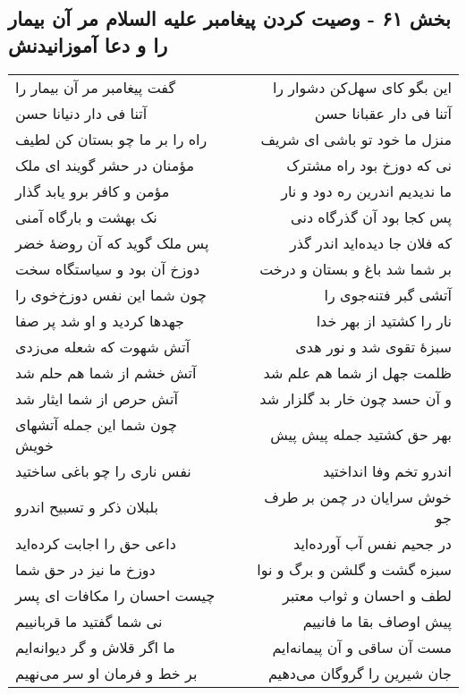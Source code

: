 \begin{center}
\section*{بخش ۶۱ - وصیت کردن پیغامبر علیه السلام مر آن بیمار را و دعا آموزانیدنش}
\label{sec:sh061}
\begin{longtable}{l p{0.5cm} r}
گفت پیغامبر مر آن بیمار را
&&
این بگو کای سهل‌کن دشوار را
\\
آتنا فی دار دنیانا حسن
&&
آتنا فی دار عقبانا حسن
\\
راه را بر ما چو بستان کن لطیف
&&
منزل ما خود تو باشی ای شریف
\\
مؤمنان در حشر گویند ای ملک
&&
نی که دوزخ بود راه مشترک
\\
مؤمن و کافر برو یابد گذار
&&
ما ندیدیم اندرین ره دود و نار
\\
نک بهشت و بارگاه آمنی
&&
پس کجا بود آن گذرگاه دنی
\\
پس ملک گوید که آن روضهٔ خضر
&&
که فلان جا دیده‌اید اندر گذر
\\
دوزخ آن بود و سیاستگاه سخت
&&
بر شما شد باغ و بستان و درخت
\\
چون شما این نفس دوزخ‌خوی را
&&
آتشی گبر فتنه‌جوی را
\\
جهدها کردید و او شد پر صفا
&&
نار را کشتید از بهر خدا
\\
آتش شهوت که شعله می‌زدی
&&
سبزهٔ تقوی شد و نور هدی
\\
آتش خشم از شما هم حلم شد
&&
ظلمت جهل از شما هم علم شد
\\
آتش حرص از شما ایثار شد
&&
و آن حسد چون خار بد گلزار شد
\\
چون شما این جمله آتشهای خویش
&&
بهر حق کشتید جمله پیش پیش
\\
نفس ناری را چو باغی ساختید
&&
اندرو تخم وفا انداختید
\\
بلبلان ذکر و تسبیح اندرو
&&
خوش سرایان در چمن بر طرف جو
\\
داعی حق را اجابت کرده‌اید
&&
در جحیم نفس آب آورده‌اید
\\
دوزخ ما نیز در حق شما
&&
سبزه گشت و گلشن و برگ و نوا
\\
چیست احسان را مکافات ای پسر
&&
لطف و احسان و ثواب معتبر
\\
نی شما گفتید ما قربانییم
&&
پیش اوصاف بقا ما فانییم
\\
ما اگر قلاش و گر دیوانه‌ایم
&&
مست آن ساقی و آن پیمانه‌ایم
\\
بر خط و فرمان او سر می‌نهیم
&&
جان شیرین را گروگان می‌دهیم
\\

\end{longtable}
\end{center}
